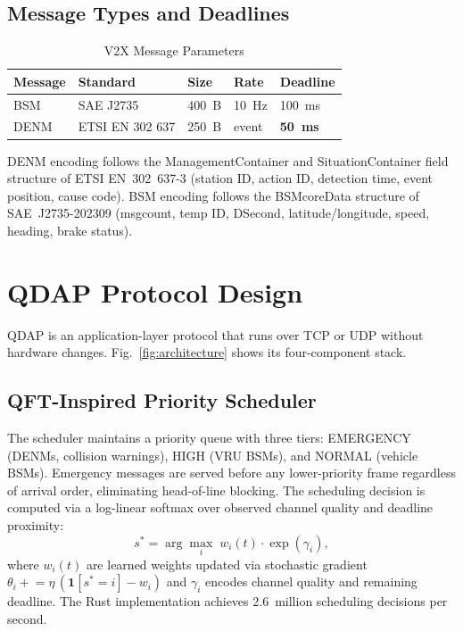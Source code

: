 \documentclass[journal]{IEEEtran}
\begin{document}
\subsection{Message Types and Deadlines}

\begin{table}[h]
\centering
\caption{V2X Message Parameters}
\label{tab:messages}
\begin{tabular}{lllll}
\toprule
Message & Standard      & Size  & Rate     & Deadline \\
\midrule
BSM     & SAE J2735     & 400~B & 10~Hz    & 100~ms   \\
DENM    & ETSI EN 302 637 & 250~B & event & \textbf{50~ms}    \\
\bottomrule
\end{tabular}
\end{table}

DENM encoding follows the ManagementContainer and SituationContainer
field structure of ETSI EN~302~637-3 (station ID, action ID, detection
time, event position, cause code).
BSM encoding follows the BSMcoreData structure of SAE~J2735-202309
(msg\textunderscore count, temp ID, DSecond, latitude/longitude, speed,
heading, brake status).


\section{QDAP Protocol Design}
\label{sec:qdap}

QDAP is an application-layer protocol that runs over TCP or UDP without
hardware changes.
Fig.~\ref{fig:architecture} shows its four-component stack.


\subsection{QFT-Inspired Priority Scheduler}

The scheduler maintains a priority queue with three tiers: EMERGENCY
(DENMs, collision warnings), HIGH (VRU BSMs), and NORMAL (vehicle BSMs).
Emergency messages are served before any lower-priority frame regardless
of arrival order, eliminating head-of-line blocking.
The scheduling decision is computed via a log-linear softmax over observed
channel quality and deadline proximity:
\begin{equation}
  s^* = \arg\max_i \; w_i(t) \cdot \exp\!\left(\gamma_i\right),
  \label{eq:scheduler}
\end{equation}
where $w_i(t)$ are learned weights updated via stochastic gradient
$\theta_i \mathrel{+}= \eta\,(\mathbf{1}[s^*{=}i] - w_i)$ and $\gamma_i$
encodes channel quality and remaining deadline.
The Rust implementation achieves 2.6~million scheduling decisions per second.
\end{document}
